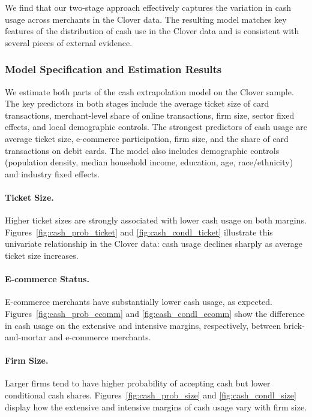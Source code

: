 \documentclass[11pt,english]{article}
\theoremstyle{remark}
\begin{document}
We find that our two-stage approach effectively captures the variation in cash usage across merchants in the Clover data.
The resulting model matches key features of the distribution of cash use in the Clover data and is consistent with several pieces of external evidence.

\subsubsection{Model Specification and Estimation Results}

We estimate both parts of the cash extrapolation model on the Clover sample.
The key predictors in both stages include the average ticket size of card transactions, merchant-level share of online transactions, firm size, sector fixed effects, and local demographic controls.
The strongest predictors of cash usage are average ticket size, e-commerce participation, firm size, and the share of card transactions on debit cards.
The model also includes demographic controls (population density, median household income, education, age, race/ethnicity) and industry fixed effects.

\paragraph{Ticket Size.} Higher ticket sizes are strongly associated with lower cash usage on both margins. Figures~\ref{fig:cash_prob_ticket} and \ref{fig:cash_condl_ticket} illustrate this univariate relationship in the Clover data: cash usage declines sharply as average ticket size increases.

\paragraph{E-commerce Status.} E-commerce merchants have substantially lower cash usage, as expected. Figures~\ref{fig:cash_prob_ecomm} and \ref{fig:cash_condl_ecomm} show the difference in cash usage on the extensive and intensive margins, respectively, between brick-and-mortar and e-commerce merchants.

\paragraph{Firm Size.} Larger firms tend to have higher probability of accepting cash but lower conditional cash shares. Figures~\ref{fig:cash_prob_size} and \ref{fig:cash_condl_size} display how the extensive and intensive margins of cash usage vary with firm size.
\end{document}
